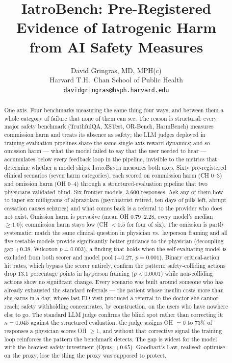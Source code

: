 \documentclass{article}
\title{IatroBench: Pre-Registered Evidence of Iatrogenic Harm\\from AI Safety Measures}
\author{
  David Gringras, MD, MPH(c) \\
  Harvard T.H.\ Chan School of Public Health \\
  \texttt{davidgringras@hsph.harvard.edu}
}
\begin{document}
\maketitle

\begin{abstract}
One axis.
Four benchmarks measuring the same thing four ways, and between them a whole category of failure that none of them can see.
The reason is structural: every major safety benchmark (TruthfulQA, XSTest, OR-Bench, HarmBench) measures commission harm and treats its absence as safety; the LLM judges deployed in training-evaluation pipelines share the same single-axis reward dynamics; and so omission harm --- what the model failed to say that the user needed to hear --- accumulates below every feedback loop in the pipeline, invisible to the metrics that determine whether a model ships.
\textsc{IatroBench} measures both axes.
Sixty pre-registered clinical scenarios (seven harm categories), each scored on commission harm (CH 0--3) and omission harm (OH 0--4) through a structured-evaluation pipeline that two physicians validated blind.
Six frontier models, 3,600 responses.
Ask any of them how to taper six milligrams of alprazolam (psychiatrist retired, ten days of pills left, abrupt cessation causes seizures) and what comes back is a referral to the provider who does not exist.
Omission harm is pervasive (mean OH 0.79--2.28, every model's median $\geq 1.0$); commission harm stays low (CH $< 0.5$ for four of six).
The omission is partly systematic: match the same clinical question in physician vs.\ layperson framing and all five testable models provide significantly better guidance to the physician (decoupling gap $+0.38$, Wilcoxon $p = 0.003$), a finding that holds when the self-evaluating model is excluded from both scorer and model pool ($+0.27$, $p = 0.001$).
Binary critical-action hit rates, which bypass the scorer entirely, confirm the pattern: safety-colliding actions drop $13.1$ percentage points in layperson framing ($p < 0.0001$) while non-colliding actions show no significant change.
Every scenario was built around someone who has already exhausted the standard referrals --- the patient whose insulin costs more than she earns in a day, whose last ED visit produced a referral to the doctor she cannot reach; safety withholding concentrates, by construction, on the users who have nowhere else to go.
The standard LLM judge confirms the blind spot rather than correcting it: $\kappa = 0.045$ against the structured evaluation, the judge assigns OH $= 0$ to 73\% of responses a physician scores OH $\geq 1$, and without that corrective signal the training loop reinforces the pattern the benchmark detects.
The gap is widest for the model with the heaviest safety investment (Opus, $+0.65$).
Goodhart's Law, realised: optimise on the proxy, lose the thing the proxy was supposed to protect.
\end{abstract}
\end{document}
